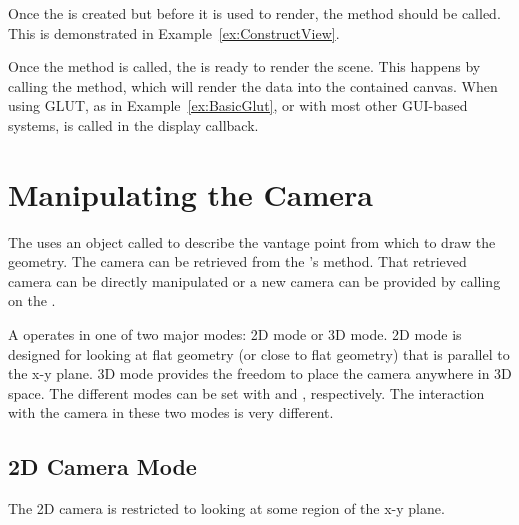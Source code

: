 
Once the  is created but before it is used to render,
the  method should be called. This is demonstrated in
Example~\ref{ex:ConstructView}.

Once the  method is called, the 
is ready to render the scene. This happens by calling the 
method, which will render the data into the contained canvas. When using
GLUT, as in Example~\ref{ex:BasicGlut}, or with most other GUI-based
systems,  is called in the display callback.




\section{Manipulating the Camera}


The  uses an object called  to
describe the vantage point from which to draw the geometry. The camera can
be retrieved from the 's  method.
That retrieved camera can be directly manipulated or a new camera can be
provided by calling  on the .

A  operates in one of two major modes: 2D mode or 3D
mode. 2D mode is designed for looking at flat geometry (or close to flat
geometry) that is parallel to the x-y plane. 3D mode provides the freedom
to place the camera anywhere in 3D space. The different modes can be set
with  and , respectively. The
interaction with the camera in these two modes is very different.

\subsection{2D Camera Mode}


The 2D camera is restricted to looking at some region of the x-y plane.

